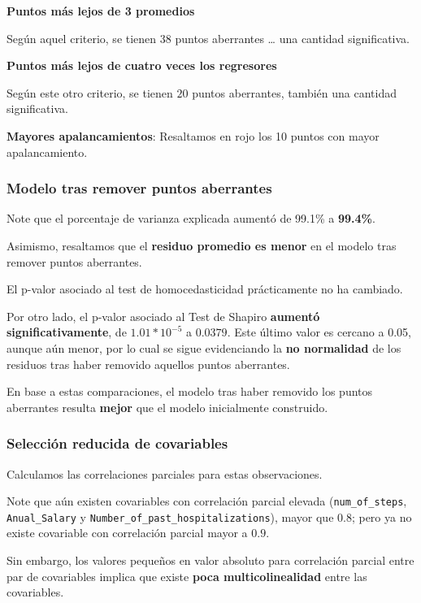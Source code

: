 \documentclass[
]{article}
\begin{document}
\textbf{Puntos más lejos de 3 promedios}

Según aquel criterio, se tienen \(38\) puntos aberrantes \ldots{} una
cantidad significativa.

\textbf{Puntos más lejos de cuatro veces los regresores}

Según este otro criterio, se tienen \(20\) puntos aberrantes, también
una cantidad significativa.

\textbf{Mayores apalancamientos}: Resaltamos en rojo los 10 puntos con
mayor apalancamiento.

\subsubsection{Modelo tras remover puntos
aberrantes}\label{modelo-tras-remover-puntos-aberrantes}

Note que el porcentaje de varianza explicada aumentó de 99.1\% a
\textbf{99.4\%}.

Asimismo, resaltamos que el \textbf{residuo promedio es menor} en el
modelo tras remover puntos aberrantes.

El p-valor asociado al test de homocedasticidad prácticamente no ha
cambiado.

Por otro lado, el p-valor asociado al Test de Shapiro \textbf{aumentó
significativamente}, de \(1.01*10^{-5}\) a \(0.0379\). Este último valor
es cercano a 0.05, aunque aún menor, por lo cual se sigue evidenciando
la \textbf{no normalidad} de los residuos tras haber removido aquellos
puntos aberrantes.

En base a estas comparaciones, el modelo tras haber removido los puntos
aberrantes resulta \textbf{mejor} que el modelo inicialmente construido.

\subsubsection{Selección reducida de
covariables}\label{selecciuxf3n-reducida-de-covariables}

Calculamos las correlaciones parciales para estas observaciones.

Note que aún existen covariables con correlación parcial elevada
(\texttt{num\_of\_steps}, \texttt{Anual\_Salary} y
\texttt{Number\_of\_past\_hospitalizations}), mayor que 0.8; pero ya no
existe covariable con correlación parcial mayor a \(0.9\).

Sin embargo, los valores pequeños en valor absoluto para correlación
parcial entre par de covariables implica que existe \textbf{poca
multicolinealidad} entre las covariables.
\end{document}
